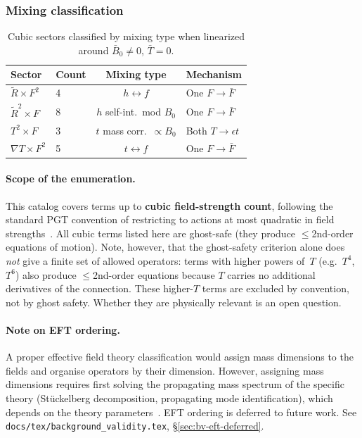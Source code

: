 \documentclass[12pt,a4paper]{article}
\newcommand{\Rt}{\tilde{R}}         %
\newcommand{\del}{\nabla}            %
\begin{document}
\subsubsection{Mixing classification}

\begin{table}[htbp]
\centering
\caption{Cubic sectors classified by mixing type when linearized
  around $\bar{B}_0 \neq 0$, $\bar{T} = 0$.}
\label{tab:cubic_mixing}
\small
\begin{tabular}{@{}llcl@{}}
\toprule
\textbf{Sector} & \textbf{Count} & \textbf{Mixing type} & \textbf{Mechanism} \\
\midrule
$\Rt \times F^2$ & 4 & $h \leftrightarrow f$ & One $F \to \bar{F}$ \\
$\Rt^2 \times F$ & 8 & $h$ self-int.\ mod $B_0$ & One $F \to \bar{F}$ \\
$T^2 \times F$ & 3 & $t$ mass corr.\ $\propto B_0$ & Both $T \to \epsilon t$ \\
$\del T \times F^2$ & 5 & $t \leftrightarrow f$ & One $F \to \bar{F}$ \\
\bottomrule
\end{tabular}

\paragraph{Scope of the enumeration.}
This catalog covers terms up to \textbf{cubic field-strength count},
following the standard PGT convention of restricting to actions at most
quadratic in field strengths~\cite{blagojevic2018ghost,shapiro2002torsion}.
All cubic terms listed here are ghost-safe (they produce $\leq$2nd-order
equations of motion).  Note, however, that the ghost-safety criterion
alone does \emph{not} give a finite set of allowed operators: terms with
higher powers of~$T$ (e.g.\ $T^4$, $T^6$) also produce $\leq$2nd-order
equations because $T$ carries no additional derivatives of the connection.
These higher-$T$ terms are excluded by convention, not by ghost safety.
Whether they are physically relevant is an open question.

\paragraph{Note on EFT ordering.}
A proper effective field theory classification would assign mass
dimensions to the fields and organise operators by their dimension.
However, assigning mass dimensions requires first solving the
propagating mass spectrum of the specific theory (Stückelberg
decomposition, propagating mode identification), which depends on the
theory parameters~\cite{aoki2020ghostfree}.  EFT ordering is deferred
to future work.  See
\texttt{docs/tex/background\_validity.tex}, \S\ref{sec:bv-eft-deferred}.
\end{table}
\end{document}
